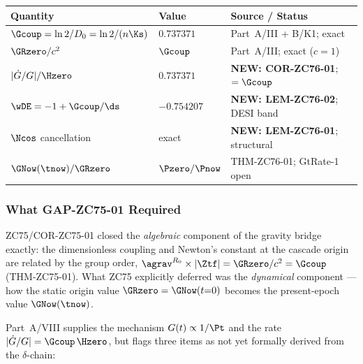 \documentclass[12pt, a4paper]{article}
\begin{document}
\begin{keybox}[title={Numerical Summary --- ZC76 (T-canonical)}]
{\small\renewcommand{\arraystretch}{1.25}
\begin{center}
\begin{tabular}{@{}p{5.0cm}p{2.6cm}p{4.4cm}@{}}
\toprule
\textbf{Quantity} & \textbf{Value} & \textbf{Source / Status} \\
\midrule
$\Gcoup = \ln2/D_0 = \ln2/(n\Ks)$ & $0.737371$
  & Part~A/III + B/K1; exact \\
$\GRzero/c^2$                      & $\Gcoup$
  & Part~A/III; exact ($c{=}1$) \\
$|\dot{G}/G|/\Hzero$               & $0.737371$
  & \textbf{NEW: COR-ZC76-01}; $= \Gcoup$ \\
$\wDE = -1 + \Gcoup/\ds$           & $-0.754207$
  & \textbf{NEW: LEM-ZC76-02}; DESI band \\
$\Ncos$ cancellation               & exact
  & \textbf{NEW: LEM-ZC76-01}; structural \\
$\GNow(\tnow)/\GRzero$             & $\Pzero/\Pnow$
  & THM-ZC76-01; GtRate-1 open \\
\bottomrule
\end{tabular}
\end{center}}
\end{keybox}

\subsubsection{What GAP-ZC75-01 Required}

ZC75/COR-ZC75-01 closed the \emph{algebraic} component of the gravity
bridge exactly: the dimensionless coupling and Newton's constant at the
cascade origin are related by the group order,
$\agrav^{R_0}\times|\Ztf| = \GRzero/c^2 = \Gcoup$ (THM-ZC75-01).
What ZC75 explicitly deferred was the \emph{dynamical} component ---
how the static origin value $\GRzero = \GNow(t{=}0)$ becomes the
present-epoch value $\GNow(\tnow)$.

Part~A/VIII supplies the mechanism $G(t)\propto 1/\Pt$ and the rate
$|\dot{G}/G| = \Gcoup\,\Hzero$, but flags three items as not yet
formally derived from the $\delta$-chain:
\end{document}
